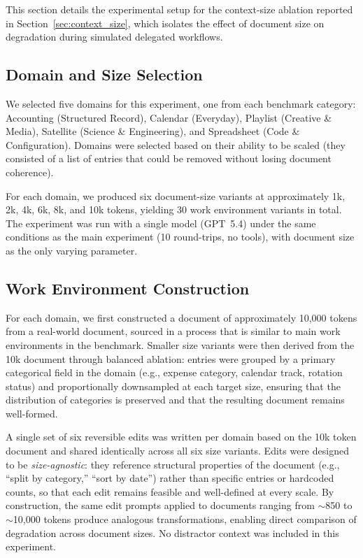 \documentclass{article} %
\begin{document}
This section details the experimental setup for the context-size ablation reported in Section~\ref{sec:context_size}, which isolates the effect of document size on degradation during simulated delegated workflows.

\subsection{Domain and Size Selection}

We selected five domains for this experiment, one from each benchmark category: Accounting (Structured Record), Calendar (Everyday), Playlist (Creative \& Media), Satellite (Science \& Engineering), and Spreadsheet (Code \& Configuration). Domains were selected based on their ability to be scaled (they consisted of a list of entries that could be removed without losing document coherence).

For each domain, we produced six document-size variants at approximately 1k, 2k, 4k, 6k, 8k, and 10k tokens, yielding 30 work environment variants in total. The experiment was run with a single model (GPT~5.4) under the same conditions as the main experiment (10 round-trips, no tools), with document size as the only varying parameter.

\subsection{Work Environment Construction}

For each domain, we first constructed a document of approximately 10,000 tokens from a real-world document, sourced in a process that is similar to main work environments in the benchmark. Smaller size variants were then derived from the 10k document through balanced ablation: entries were grouped by a primary categorical field in the domain (e.g., expense category, calendar track, rotation status) and proportionally downsampled at each target size, ensuring that the distribution of categories is preserved and that the resulting document remains well-formed.

A single set of six reversible edits was written per domain based on the 10k token document and shared identically across all six size variants. Edits were designed to be \textit{size-agnostic}: they reference structural properties of the document (e.g., ``split by category,'' ``sort by date'') rather than specific entries or hardcoded counts, so that each edit remains feasible and well-defined at every scale. By construction, the same edit prompts applied to documents ranging from ${\sim}$850 to ${\sim}$10,000 tokens produce analogous transformations, enabling direct comparison of degradation across document sizes. No distractor context was included in this experiment.
\end{document}
